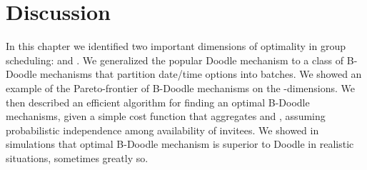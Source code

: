 \section{Discussion}
\label{bdoodle:sec:discussion}

In this chapter we identified two important dimensions of optimality in
group scheduling: \Times and \Inconvenience. We generalized the popular
Doodle mechanism to a class of B-Doodle mechanisms that partition date/time
options into batches. We showed an example of the Pareto-frontier of
B-Doodle mechanisms on the \Time-\Inconveniences dimensions. We then
described an efficient algorithm for finding an optimal B-Doodle
mechanisms, given a simple cost function that aggregates \Times and
\Inconvenience, assuming probabilistic independence among availability
of invitees. We showed in simulations that optimal B-Doodle mechanism
is superior to Doodle in realistic situations, sometimes greatly so.


%
